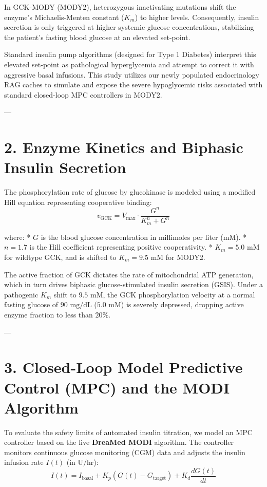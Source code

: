 \documentclass[11pt,twocolumn]{article}
\begin{document}
In GCK-MODY (MODY2), heterozygous inactivating mutations shift the enzyme's Michaelis-Menten constant ($K_m$) to higher levels. Consequently, insulin secretion is only triggered at higher systemic glucose concentrations, stabilizing the patient’s fasting blood glucose at an elevated set-point. 

Standard insulin pump algorithms (designed for Type 1 Diabetes) interpret this elevated set-point as pathological hyperglycemia and attempt to correct it with aggressive basal infusions. This study utilizes our newly populated endocrinology RAG caches to simulate and expose the severe hypoglycemic risks associated with standard closed-loop MPC controllers in MODY2.

---

\section{2. Enzyme Kinetics and Biphasic Insulin Secretion}
The phosphorylation rate of glucose by glucokinase is modeled using a modified Hill equation representing cooperative binding:
$$v_{\text{GCK}} = V_{\text{max}} \cdot \frac{G^n}{K_m^n + G^n}$$

where:
*   $G$ is the blood glucose concentration in millimoles per liter ($\text{mM}$).
*   $n = 1.7$ is the Hill coefficient representing positive cooperativity.
*   $K_m = 5.0\text{ mM}$ for wildtype GCK, and is shifted to $K_m = 9.5\text{ mM}$ for MODY2.

The active fraction of GCK dictates the rate of mitochondrial ATP generation, which in turn drives biphasic glucose-stimulated insulin secretion (GSIS). Under a pathogenic $K_m$ shift to $9.5\text{ mM}$, the GCK phosphorylation velocity at a normal fasting glucose of $90\text{ mg/dL}$ ($5.0\text{ mM}$) is severely depressed, dropping active enzyme fraction to less than $20\%$.

---

\section{3. Closed-Loop Model Predictive Control (MPC) and the MODI Algorithm}
To evaluate the safety limits of automated insulin titration, we model an MPC controller based on the live \textbf{DreaMed MODI} algorithm. The controller monitors continuous glucose monitoring (CGM) data and adjusts the insulin infusion rate $I(t)$ (in $\text{U/hr}$):
$$I(t) = I_{\text{basal}} + K_p \left(G(t) - G_{\text{target}}\right) + K_d \frac{dG(t)}{dt}$$
\end{document}
